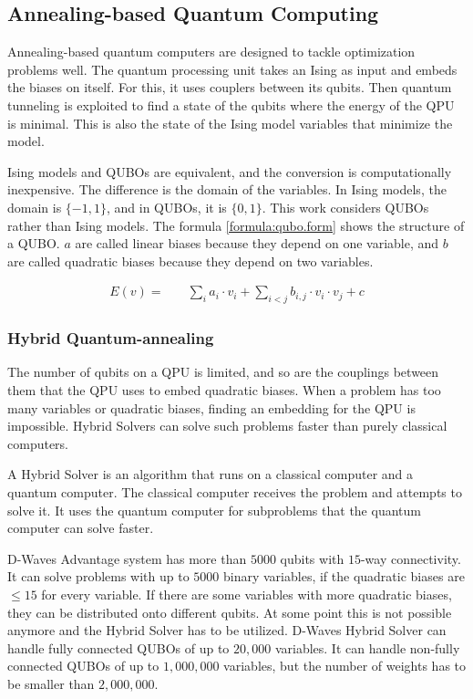 \subsection{Annealing-based Quantum Computing}
\label{backg:annealing}

Annealing-based quantum computers are designed to tackle optimization problems well.
The quantum processing unit takes an Ising as input and embeds the biases on itself.
For this, it uses couplers between its qubits.
Then quantum tunneling is exploited to find a state of the qubits where the energy of the QPU is minimal.
This is also the state of the Ising model variables that minimize the model.
\cite{Boixo2013}

Ising models and QUBOs are equivalent, and the conversion is computationally inexpensive.
The difference is the domain of the variables.
\cite{Bian2010}
In Ising models, the domain is $\{-1, 1\}$, and in QUBOs, it is $\{0, 1\}$.
This work considers QUBOs rather than Ising models.
The formula \ref{formula:qubo.form} shows the structure of a QUBO.
$a$ are called linear biases because they depend on one variable, and $b$ are called quadratic biases because they depend on two variables.

\begin{align}
  \label{formula:qubo.form}
  E(v) = & \quad
  \sum_i a_i \cdot v_i
  + \sum_{i < j} b_{i, j} \cdot v_i \cdot v_j
  + c
\end{align}

\subsubsection{Hybrid Quantum-annealing}

The number of qubits on a QPU is limited, and so are the couplings between them that the QPU uses to embed quadratic biases.
When a problem has too many variables or quadratic biases, finding an embedding for the QPU is impossible.
Hybrid Solvers can solve such problems faster than purely classical computers.
\cite{Bernoudy2020}

A Hybrid Solver is an algorithm that runs on a classical computer and a quantum computer.
The classical computer receives the problem and attempts to solve it.
It uses the quantum computer for subproblems that the quantum computer can solve faster.
\cite{Zhang2016}

D-Waves Advantage system has more than $5000$ qubits with $15$-way connectivity.
\cite{D-Wave2020}
It can solve problems with up to $5000$ binary variables, if the quadratic biases are $\leq 15$ for every variable.
If there are some variables with more quadratic biases, they can be distributed onto different qubits.
At some point this is not possible anymore and the Hybrid Solver has to be utilized.
D-Waves Hybrid Solver can handle fully connected QUBOs of up to $20, 000$ variables.
It can handle non-fully connected QUBOs of up to $1, 000, 000$ variables, but the number of weights has to be smaller than $2, 000, 000$.
\cite{Bernoudy2020}

